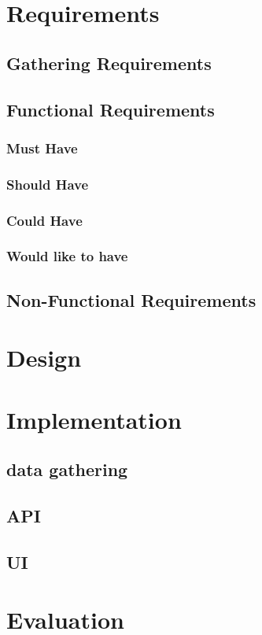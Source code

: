 \documentclass{l4proj}
\begin{document}
\chapter{Requirements}
\label{requirements}
\section{Gathering Requirements}
\section{Functional Requirements}
\subsection{Must Have}
\subsection{Should Have}
\subsection{Could Have}
\subsection{Would like to have}
\section{Non-Functional Requirements}

\chapter{Design}
\label{design}
\chapter{Implementation}
\label{implementation}
\section{data gathering}
\section{API}
\section{UI}

\chapter{Evaluation}
\label{evaluation}
\end{document}
